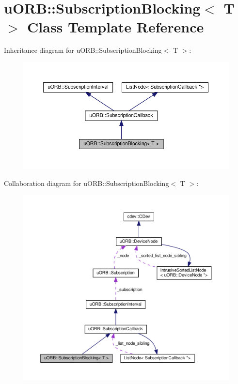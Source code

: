 \hypertarget{classuORB_1_1SubscriptionBlocking}{}\section{u\+O\+RB\+:\+:Subscription\+Blocking$<$ T $>$ Class Template Reference}
\label{classuORB_1_1SubscriptionBlocking}


Inheritance diagram for u\+O\+RB\+:\+:Subscription\+Blocking$<$ T $>$\+:\nopagebreak
\begin{figure}[H]
\begin{center}
\leavevmode
\includegraphics[width=350pt]{df/d8b/classuORB_1_1SubscriptionBlocking__inherit__graph}
\end{center}
\end{figure}


Collaboration diagram for u\+O\+RB\+:\+:Subscription\+Blocking$<$ T $>$\+:\nopagebreak
\begin{figure}[H]
\begin{center}
\leavevmode
\includegraphics[width=350pt]{d4/d7d/classuORB_1_1SubscriptionBlocking__coll__graph}
\end{center}
\end{figure}
